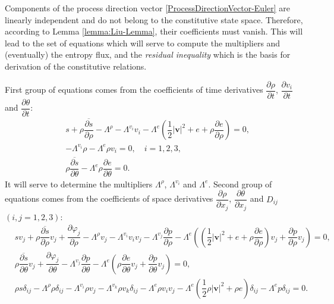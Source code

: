 \documentclass[a4paper,fleqn]{cas-sc}
\theoremstyle{definition}
\begin{document}
Components of the process direction vector \eqref{ProcessDirectionVector-Euler} are linearly independent and do not belong to the constitutive state space. Therefore, according to Lemma \ref{lemma:Liu-Lemma}, their coefficients must vanish. This will lead to the set of equations which will serve to compute the multipliers and (eventually) the entropy flux, and the \emph{residual inequality} which is the basis for derivation of the constitutive relations. 

First group of equations comes from the coefficients of time derivatives $\dfrac{\partial\rho}{\partial t}$, $\dfrac{\partial v_i}{\partial t}$ and $\dfrac{\partial\theta}{\partial t}$:
\begin{align}
	\label{Trho Ojlerovi fluidi}
	& s+\rho\overline{\dfrac{\partial s}{\partial\rho}}-\Lambda^\rho-\Lambda^{v_i}v_i-\Lambda^ e\left(\dfrac{1}{2}|\mathbf{v}|^2+e+\rho\dfrac{\partial e}{\partial\rho}\right)=0, 
	\\
	\label{Tvi Ojlerovi fluidi}
	& -\Lambda^{v_i}\rho-\Lambda^ e\rho v_i=0, \quad i=1,2,3, 
	\\
	\label{Ttheta Ojlerovi fluidi}
	& \rho\overline{\dfrac{\partial s}{\partial\theta}}-\Lambda^ e\rho\dfrac{\partial e}{\partial\theta}=0.
\end{align}
It will serve to determine the multipliers $\Lambda^\rho$, $\Lambda^{v_i}$ and $\Lambda^e$. 
Second group of equations comes from the coefficients of space derivatives $\dfrac{\partial\rho}{\partial x_j}$, $\dfrac{\partial\theta}{\partial x_j}$ and $D_{ij}$ $(i,j = 1, 2, 3)$:
\begin{align} 
	\label{Xrho Ojlerovi fluidi}
	& sv_j +\rho\overline{\dfrac{\partial s}{\partial\rho}} v_j+\dfrac{\partial\varphi_j}{\partial\rho}-\Lambda^\rho v_j-\Lambda^{v_i}v_iv_j-\Lambda^{v_j}\dfrac{\partial p}{\partial\rho} 
	-\Lambda^ e\left(\left(\dfrac{1}{2}|\mathbf{v}|^2+e+\rho\dfrac{\partial e}{\partial\rho}\right)v_j+\dfrac{\partial p}{\partial\rho}v_j\right)=0, %
	\\
	\label{Xtheta Ojlerovi fluidi}
	& \rho\overline{\dfrac{\partial s}{\partial\theta}} v_j+\dfrac{\partial\varphi_j}{\partial\theta}-\Lambda^{v_j}\dfrac{\partial p}{\partial\theta}-\Lambda^ e\left(\rho\dfrac{\partial e}{\partial\theta}v_j+\dfrac{\partial p}{\partial\theta}v_j\right)=0, %
	\\
	\label{Dij Ojlerovi fluidi}
	& \rho s\delta_{ij} - \Lambda^\rho \rho \delta_{ij} - \Lambda^{v_i} \rho v_j - \Lambda^{v_k} \rho v_k \delta_{ij} %
	- \Lambda^e \rho v_i v_j - \Lambda^e \left( \dfrac{1}{2} \rho|\mathbf{v}|^2 + \rho e \right) \delta_{ij} - \Lambda^e p \delta_{ij} = 0. 
\end{align}
\end{document}
